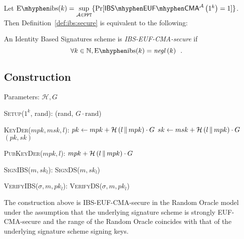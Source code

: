    Let $\mathrm{E \mhyphen ibs}(k) = \underset{\adversary \in
    \mathtt{PPT}}{\sup}\{\Pr[\mathsf{IBS \mhyphen EUF \mhyphen
    CMA}^{\adversary}\left(1^k\right) = 1]\}$. Then
    Definition~\ref{def:ibs:secure} is equivalent to the following:

    \begin{definition}
      \label{def:ibs:secure:sup}
      An Identity Based Signatures scheme is \emph{\textsf{IBS-EUF-CMA}-secure}
      if
      \begin{equation*}
        \forall k \in \mathbb{N}, \mathrm{E \mhyphen ibs}(k) =
        \mathit{negl}\left(k\right) \enspace.
      \end{equation*}
    \end{definition}

  \subsection{Construction}
    Parameters: $\mathcal{H}, G$
    \begin{algorithmic}[0]
      \State \textsc{Setup}($1^k$, rand):
      \Indent
        \State \Return (rand, $G \cdot \mathrm{rand}$)
      \EndIndent
    \end{algorithmic}

    \begin{algorithmic}[0]
      \State \textsc{KeyDer}($mpk, msk, l$):
      \Indent
        \State $pk \gets mpk + \mathcal{H}\left(l \,\|\, mpk\right) \cdot G$
        \State $sk \gets msk + \mathcal{H}\left(l \,\|\, mpk\right) \cdot G$
        \State \Return $(pk, sk)$
      \EndIndent
    \end{algorithmic}

    \begin{algorithmic}[0]
      \State \textsc{PubKeyDer}($mpk, l$):
      \Indent
        \State \Return $mpk + \mathcal{H}\left(l \,\|\, mpk\right) \cdot G$
      \EndIndent
    \end{algorithmic}

    \begin{algorithmic}[0]
      \State \textsc{SignIBS}($m, sk_l$):
      \Indent
        \State \Return \textsc{SignDS}($m, sk_l$)
      \EndIndent
    \end{algorithmic}

    \begin{algorithmic}[0]
      \State \textsc{VerifyIBS}($\sigma, m, pk_l$):
      \Indent
        \State \Return \textsc{VerifyDS}($\sigma, m, pk_l$)
      \EndIndent
    \end{algorithmic}

    \begin{theorem}
      \label{theorem:ibs}
      The construction above is \textsf{IBS-EUF-CMA}-secure in the Random Oracle
      model under the assumption that the underlying signature scheme is
      strongly \textsf{EUF-CMA}-secure and the range of the Random Oracle
      coincides with that of the underlying signature scheme signing keys.
    \end{theorem}
